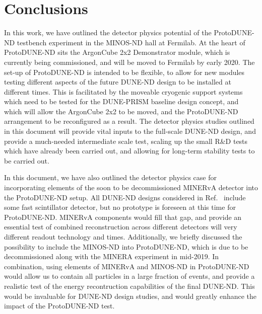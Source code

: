 \section{Conclusions}
\label{sec:conclusions}

In this work, we have outlined the detector physics potential of the ProtoDUNE-ND testbench experiment in the MINOS-ND hall at Fermilab. At the heart of ProtoDUNE-ND sits the ArgonCube 2x2 Demonstrator module, which is currently being commissioned, and will be moved to Fermilab by early 2020. The set-up of ProtoDUNE-ND is intended to be flexible, to allow for new modules testing different aspects of the future DUNE-ND design to be installed at different times. This is facilitated by the moveable cryogenic support systems which need to be tested for the DUNE-PRISM baseline design concept, and which will allow the ArgonCube 2x2 to be moved, and the ProtoDUNE-ND arrangement to be reconfigured as a result. The detector physics studies outlined in this document will provide vital inputs to the full-scale DUNE-ND design, and provide a much-needed intermediate scale test, scaling up the small R\&D tests which have already been carried out, and allowing for long-term stability tests to be carried out.

In this document, we have also outlined the detector physics case for incorporating elements of the soon to be decommissioned MINERvA detector into the ProtoDUNE-ND setup. All DUNE-ND designs considered in Ref.~\cite{dune_ndcsg} include some fast scintillator detector, but no prototype is foreseen at this time for ProtoDUNE-ND. MINERvA components would fill that gap, and provide an essential test of combined reconstruction across different detectors will very different readout technology and times. Additionally, we briefly discussed the possibility to include the MINOS-ND into ProtoDUNE-ND, which is due to be decommissioned along with the MINERA experiment in mid-2019. In combination, using elements of MINERvA and MINOS-ND in ProtoDUNE-ND would allow us to contain all particles in a large fraction of events, and provide a realistic test of the energy recontruction capabilities of the final DUNE-ND. This would be invaluable for DUNE-ND design studies, and would greatly enhance the impact of the ProtoDUNE-ND test.

